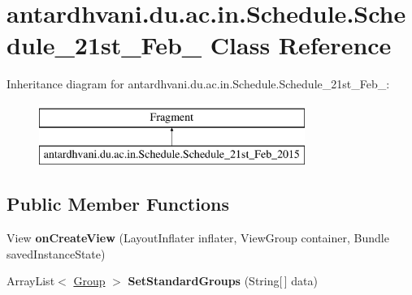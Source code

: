 \hypertarget{classantardhvani_1_1du_1_1ac_1_1in_1_1_schedule_1_1_schedule__21st___feb__2015}{}\section{antardhvani.\+du.\+ac.\+in.\+Schedule.\+Schedule\+\_\+21st\+\_\+\+Feb\+\_ Class Reference}
\label{classantardhvani_1_1du_1_1ac_1_1in_1_1_schedule_1_1_schedule__21st___feb__2015}
Inheritance diagram for antardhvani.\+du.\+ac.\+in.\+Schedule.\+Schedule\+\_\+21st\+\_\+\+Feb\+\_\+:\begin{figure}[H]
\begin{center}
\leavevmode
\includegraphics[height=2.000000cm]{classantardhvani_1_1du_1_1ac_1_1in_1_1_schedule_1_1_schedule__21st___feb__2015}
\end{center}
\end{figure}
\subsection*{Public Member Functions}
\begin{DoxyCompactItemize}
\item 
\hypertarget{classantardhvani_1_1du_1_1ac_1_1in_1_1_schedule_1_1_schedule__21st___feb__2015_aa095f24a42f8ecda2887eab4e22a1e52}{}View {\bfseries on\+Create\+View} (Layout\+Inflater inflater, View\+Group container, Bundle saved\+Instance\+State)\label{classantardhvani_1_1du_1_1ac_1_1in_1_1_schedule_1_1_schedule__21st___feb__2015_aa095f24a42f8ecda2887eab4e22a1e52}

\item 
\hypertarget{classantardhvani_1_1du_1_1ac_1_1in_1_1_schedule_1_1_schedule__21st___feb__2015_a3631088b173f88fd692b25f280cb1206}{}Array\+List$<$ \hyperlink{classantardhvani_1_1du_1_1ac_1_1in_1_1_adapter_1_1_group}{Group} $>$ {\bfseries Set\+Standard\+Groups} (String\mbox{[}$\,$\mbox{]} data)\label{classantardhvani_1_1du_1_1ac_1_1in_1_1_schedule_1_1_schedule__21st___feb__2015_a3631088b173f88fd692b25f280cb1206}

\end{DoxyCompactItemize}
